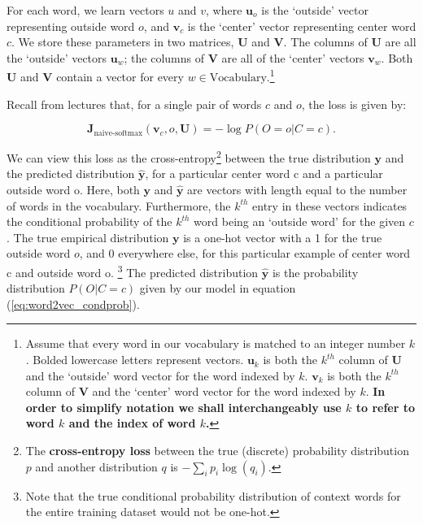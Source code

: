 \documentclass{article}
\begin{document}
    For each word, we learn vectors $u$ and $v$, where $\bm u_o$ is the `outside' vector representing outside word $o$, and $\bm v_c$ is the `center' vector representing center word $c$.
    We store these parameters in two matrices, $\bm U$ and $\bm V$.
    The columns of $\bm U$ are all the `outside' vectors $\bm u_{w}$;
    the columns of $\bm V$ are all of the `center' vectors $\bm v_{w}$.
    Both $\bm U$ and $\bm V$ contain a vector for every $w \in \text{Vocabulary}$.\footnote{Assume that every word in our vocabulary is matched to an integer number $k$. Bolded lowercase letters represent vectors. $\bm u_{k}$ is both the $k^{th}$ column of $\bm U$ and the `outside' word vector for the word indexed by $k$. $\bm v_k$ is both the $k^{th}$ column of $\bm V$ and the `center' word vector for the word indexed by $k$. \textbf{In order to simplify notation we shall interchangeably use $k$ to refer to word $k$ and the index of word $k$.}}\newline

    Recall from lectures that, for a single pair of words $c$ and $o$, the loss is given by:

    \begin{equation}
        \bm J_{\text{naive-softmax}}(\bm v_c, o, \bm U) = -\log P(O=o| C=c).
        \label{naive-softmax}
    \end{equation}

    We can view this loss as the cross-entropy\footnote{The \textbf{cross-entropy loss} between the true (discrete) probability distribution $p$ and another distribution $q$ is $-\sum_i p_i \log(q_i)$.} between the true distribution $\bm y$ and the predicted distribution $\hat{\bm y}$, for a particular center word c and a particular outside word o.
    Here, both $\bm y$ and $\hat{\bm y}$ are vectors with length equal to the number of words in the vocabulary.
    Furthermore, the $k^{th}$ entry in these vectors indicates the conditional probability of the $k^{th}$ word being an `outside word' for the given $c$.
    The true empirical distribution $\bm y$ is a one-hot vector with a 1 for the true outside word $o$, and 0 everywhere else, for this particular example of center word c and outside word o. \footnote{Note that the true conditional probability distribution of context words for the entire training dataset would not be one-hot.}
    The predicted distribution $\hat{\bm y}$ is the probability distribution $P(O|C=c)$ given by our model in equation (\ref{eq:word2vec_condprob}). \newline
\end{document}
